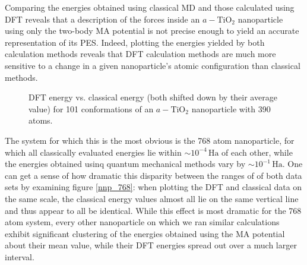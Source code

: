 \documentclass[aps,prb,twocolumn,amsmath,amssymb,superscriptaddress,longbibliography]{revtex4-1}
\newcommand\tab[1][1cm]{\hspace*{#1}} %
\begin{document}
\tab Comparing the energies obtained using classical MD and those calculated using DFT reveals that a description of the forces inside an $a-\text{TiO}_2$ nanoparticle using only the two-body MA potential is not precise enough to yield an accurate representation of its PES.
Indeed, plotting the energies yielded by both calculation methods reveals that DFT calculation methods are much more sensitive to a change in a given nanoparticle's atomic configuration than classical methods.

\begin{figure}[htb]
\caption{DFT energy vs. classical energy (both shifted down by their average value) for 101 conformations of an $a-\text{TiO}_2$ nanoparticle with 390 atoms.}
\label{nnp_390}
\end{figure}

\tab The system for which this is the most obvious is the 768 atom nanoparticle, for which all classically evaluated energies lie within $\sim 10^{-4}\,\text{Ha}$ of each other, while the energies obtained usinq quantum mechanical methods vary by $\sim 10^{-1}\,\text{Ha}$.
One can get a sense of how dramatic this disparity between the ranges of of both data sets by examining figure \ref{nnp_768}: when plotting the DFT and classical data on the same scale, the classical energy values almost all lie on the same vertical line and thus appear to all be identical. 
While this effect is most dramatic for the 768 atom system, every other nanoparticle on which we ran similar calculations exhibit significant clustering of the energies obtained using the MA potential about their mean value, while their DFT energies spread out over a much larger interval.
\end{document}
